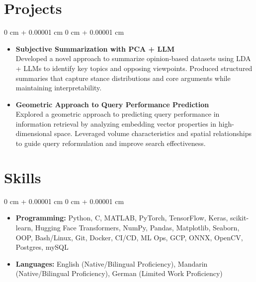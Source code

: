 \documentclass[11pt, letterpaper]{article}
\newenvironment{highlights}{
    \begin{itemize}[
        topsep=0.08 cm,
        parsep=0.08 cm,
        partopsep=0pt,
        itemsep=0pt,
        leftmargin=0.2 cm + 17pt
    ]
}
{
    \end{itemize}
}
\newenvironment{onecolentry}{
    \begin{adjustwidth}{
        0 cm + 0.00001 cm
    }{
        0 cm + 0.00001 cm
    }
}{
    \end{adjustwidth}
}
\begin{document}
\section{Projects}
\vspace{0.08 cm}
\begin{onecolentry}
    \begin{highlights}
    \item \textbf{Subjective Summarization with PCA + LLM} \\
    Developed a novel approach to summarize opinion-based datasets using LDA + LLMs to identify key topics and opposing viewpoints. Produced structured summaries that capture stance distributions and core arguments while maintaining interpretability.
    \vspace{0.1cm}
    \item \textbf{Geometric Approach to Query Performance Prediction} \\
    Explored a geometric approach to predicting query performance in information retrieval by analyzing embedding vector properties in high-dimensional space. Leveraged volume characteristics and spatial relationships to guide query reformulation and improve search effectiveness.
    \end{highlights}
\end{onecolentry}

\section{Skills}
\vspace{0.08 cm}
\begin{onecolentry}
    \begin{highlights}
        \item \textbf{Programming:} Python, C, MATLAB, PyTorch, TensorFlow, Keras, scikit-learn, Hugging Face Transformers, NumPy, Pandas, Matplotlib, Seaborn, OOP, Bash/Linux, Git, Docker, CI/CD, ML Ops, GCP, ONNX, OpenCV, Postgres, mySQL
        \item \textbf{Languages:} English (Native/Bilingual Proficiency), Mandarin (Native/Bilingual Proficiency), German (Limited Work Proficiency)
    \end{highlights}
\end{onecolentry}
\end{document}
